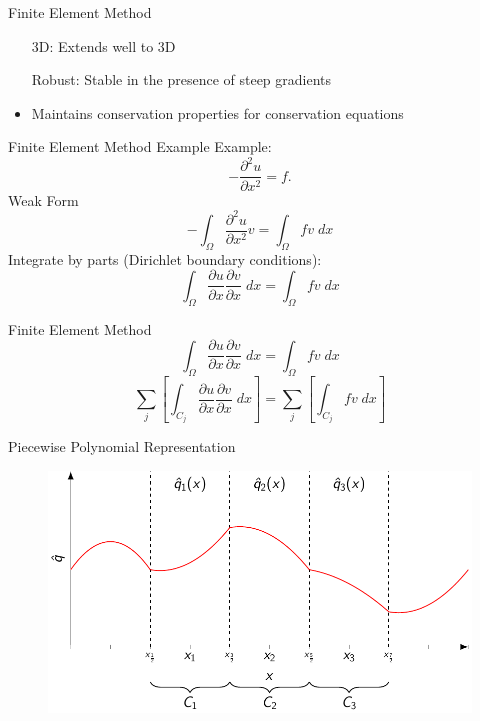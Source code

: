 \documentclass[pdf]{beamer}
\begin{document}
\begin{frame}{Finite Element Method}
	\begin{itemize}
		\item[3D:] Extends well to 3D
		\item[Robust:] Stable in the presence of steep gradients 
		\item Maintains conservation properties for conservation equations
	\end{itemize}
\end{frame}

\begin{frame}{Finite Element Method Example}
	Example:
		\[  -\frac{\partial^2 {u}}{\partial x^2}= f.\]
	Weak Form
	\[
	 -\int_{\Omega }\frac{\partial^2 {u}}{\partial x^2} v = \int_{\Omega } f v \; dx
	\]
	Integrate by parts (Dirichlet boundary conditions):
	\[
  \int_{\Omega }\frac{\partial {u}}{\partial x} \frac{\partial {v}}{\partial x} \; dx  = \int_{\Omega } f v \; dx
	\]
\end{frame}

\begin{frame}{Finite Element Method}
	\[
	 \int_{\Omega }\frac{\partial {u}}{\partial x} \frac{\partial {v}}{\partial x} \; dx  = \int_{\Omega } f v \; dx
	\]
	\[
	 \sum_j  \left[\int_{C_j} \frac{\partial {u}}{\partial x} \frac{\partial {v}}{\partial x} \; dx \right] = \sum_j \left[ \int_{C_j} f v  \; dx \right]
	\]

\end{frame}
\begin{frame}{Piecewise Polynomial Representation}
	\begin{figure}
		\includegraphics[width=\textwidth]{./Pics/PolyRep/P2.pdf}
	\end{figure}
\end{frame}
\end{document}
